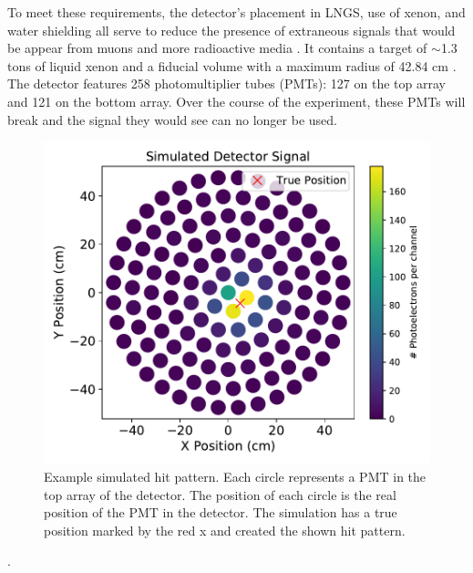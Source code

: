 \documentclass[../thesis.tex]{subfiles}
\begin{document}
To meet these requirements, the detector's placement in LNGS, use of xenon, and water shielding all serve to reduce the presence of extraneous signals that would be appear from muons and more radioactive media \cite{Xenon1t}.
It contains a target of $\sim$1.3 tons of liquid xenon and a fiducial volume with a maximum radius of 42.84 cm \cite{1TDM_DataAnalysis}.
The detector features 258 photomultiplier tubes (PMTs): 127 on the top array and 121 on the bottom array.
Over the course of the experiment, these PMTs will break and the signal they would see can no longer be used.
\begin{figure}
	\centering
	\includegraphics[width=\linewidth]{figures/opt_sim_hit_989.pdf}
	\caption{Example simulated hit pattern.
	Each circle represents a PMT in the top array of the detector.
	The position of each circle is the real position of the PMT in the detector.
	The simulation has a true position marked by the red x and created the shown hit pattern.}
	\label{fig:example_hit}
\end{figure}
 \cite{Xenon1t}.
\end{document}
